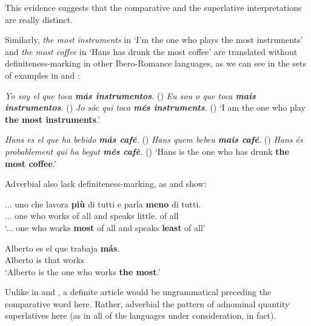 \documentclass[output=paper
,modfonts
,nonflat]{langsci/langscibook}
\begin{document}
This evidence suggests that the comparative and the superlative interpretations are really distinct.

Similarly, \textit{the most instruments} in `I'm the one who plays the most instruments' and \textit{the most coffee} in `Hans has drunk the most coffee' are translated without definiteness-marking in other Ibero-Romance languages, as we can see in the sets of examples in  and :

\ea \label{ex:coppockstrand:70}
\settowidth{}
\ea \textit{Yo soy el que toca \textbf{más instrumentos}.} \jam()
\ex \textit{Eu sou o que toca \textbf{mais instrumentos}.} \jam()
\ex \textit{Jo sóc qui toca \textbf{més instruments}.} \jam ()
`I am the one who play \textbf{the most instruments}.'
\z 
\z

\ea \label{ex:coppockstrand:71}
\settowidth{}
\ea \textit{Hans es el que ha bebido \textbf{más café}.} \jam()
\ex \textit{Hans quem bebeu \textbf{mais café}.} \jam()
\ex \textit{Hans és probablement qui ha begut \textbf{més cafè}.} \hfill ()
\sn`Hans is the one who has drunk \textbf{the most coffee}.'
\z
\z 

Adverbial  also lack definiteness-marking, as  and  show:

\ea \label{ex:coppockstrand:72}
\gll ... uno che lavora \textbf{più} di tutti e parla \textbf{meno} di tutti. \\
... one who works \cmpr{} of all and speaks little.\cmpr{} of all\\ 
\glt `... one who works \textbf{most} of all and speaks \textbf{least} of all'
\z

\ea \label{ex:coppockstrand:73}
\gll Alberto es el que trabaja \textbf{m\'as}.\\
Alberto is  that works \cmpr\\ 
\glt `Alberto is the one who works \textbf{the most}.' 
\z

Unlike in  and , a definite article would be ungrammatical preceding the comparative word here. Rather, adverbial  the pattern of adnominal quantity superlatives here (as in all of the languages under consideration, in fact).
\end{document}
